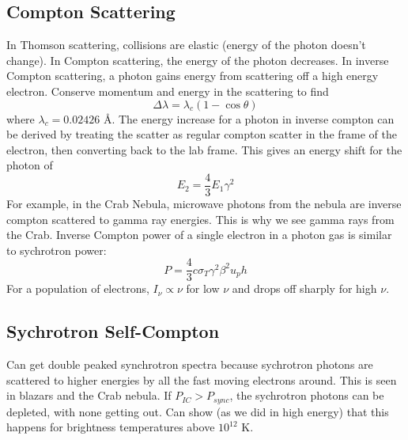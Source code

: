 \subsection{Compton Scattering}
In Thomson scattering, collisions are elastic (energy of the photon doesn't change).  In Compton 
scattering, the energy of the photon decreases.  In inverse Compton scattering, a photon gains 
energy from scattering off a high energy electron.  Conserve momentum and energy in the 
scattering to find
\begin{displaymath}\Delta \lambda=\lambda_c(1-\cos{\theta})\end{displaymath}
where $\lambda_c=0.02426$ \AA.
The energy increase for a photon in inverse compton can be derived by treating the scatter as 
regular compton scatter in the frame of the electron, then converting back to the lab frame.  
This gives an energy shift for the photon of 
\begin{displaymath}E_2=\frac{4}{3}E_1\gamma^2\end{displaymath}
For example, in the Crab Nebula, microwave photons from the nebula are inverse compton scattered 
to gamma ray energies.  This is why we see gamma rays from the Crab.  Inverse Compton power 
of a single electron in a photon gas is similar to sychrotron power:
\begin{displaymath}\boxed{P=\frac{4}{3}c\sigma_T\gamma^2\beta^2u_ph}\end{displaymath}
For a population of electrons, $I_{\nu}\propto \nu$ for low $\nu$ and drops off sharply for 
high $\nu$.

\subsection{Sychrotron Self-Compton}
Can get double peaked synchrotron spectra because sychrotron photons are scattered to higher 
energies by all the fast moving electrons around.  This is seen in blazars and the Crab nebula.  
If $P_{IC}>P_{sync}$, the sychrotron photons can be depleted, with none getting out.  Can show 
(as we did in high energy) that this happens for brightness temperatures above $10^12$ K.

